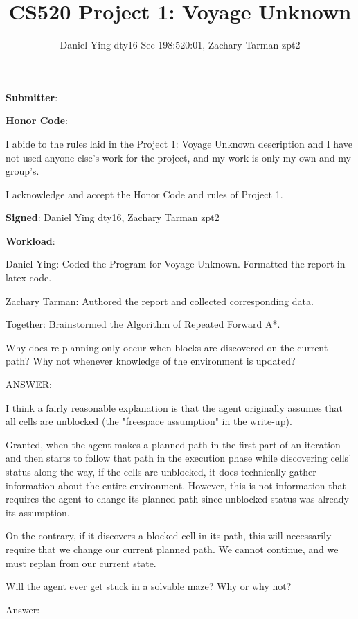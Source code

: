 \documentclass{homeworg}
\title{CS520 Project 1: Voyage Unknown}
\author{Daniel Ying dty16 Sec 198:520:01, Zachary Tarman zpt2}
\begin{document}
\maketitle

\textbf{Submitter}: 

\textbf{Honor Code}:

I abide to the rules laid in the Project 1: Voyage Unknown description and I have not used anyone else’s work for the project, and my work is only my own and my group’s.

\hrulefill

I acknowledge and accept the Honor Code and rules of Project 1.

\textbf{Signed}: Daniel Ying dty16, Zachary Tarman zpt2

\hrulefill

\textbf{Workload}: 

Daniel Ying: Coded the Program for Voyage Unknown. Formatted the report in latex code.

Zachary Tarman: Authored the report and collected corresponding data.

Together: Brainstormed the Algorithm of Repeated Forward A*.
\vspace{.5cm}

\newpage
\exercise
Why does re-planning only occur when blocks are discovered on the current path? Why not whenever knowledge of the environment is updated?

ANSWER:

I think a fairly reasonable explanation is that the agent originally assumes that all cells are unblocked (the "freespace assumption" in the write-up). 

Granted, when the agent makes a planned path in the first part of an iteration and then starts to follow that path in the execution phase while discovering cells' status along the way, if the cells are unblocked, it does technically gather information about the entire environment. However, this is not information that requires the agent to change its planned path since unblocked status was already its assumption. 

On the contrary, if it discovers a blocked cell in its path, this will necessarily require that we change our current planned path. We cannot continue, and we must replan from our current state.


\newpage
\exercise*
Will the agent ever get stuck in a solvable maze? Why or why not?

Answer:
\end{document}
